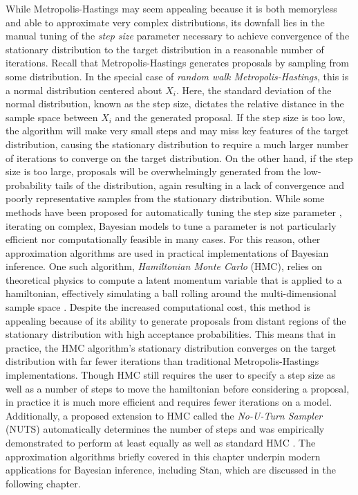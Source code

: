 \documentclass[
  12pt,
]{book}
\theoremstyle{definition}
\theoremstyle{definition}
\theoremstyle{definition}
\theoremstyle{remark}
\begin{document}
While Metropolis-Hastings may seem appealing because it is both memoryless and able to approximate very complex distributions, its downfall lies in the manual tuning of the \emph{step size} parameter necessary to achieve convergence of the stationary distribution to the target distribution in a reasonable number of iterations.
Recall that Metropolis-Hastings generates proposals by sampling from some distribution.
In the special case of \emph{random walk Metropolis-Hastings}, this is a normal distribution centered about \(X_{i}\).
Here, the standard deviation of the normal distribution, known as the step size, dictates the relative distance in the sample space between \(X_{i}\) and the generated proposal.
If the step size is too low, the algorithm will make very small steps and may miss key features of the target distribution, causing the stationary distribution to require a much larger number of iterations to converge on the target distribution.
On the other hand, if the step size is too large, proposals will be overwhelmingly generated from the low-probability tails of the distribution, again resulting in a lack of convergence and poorly representative samples from the stationary distribution.
While some methods have been proposed for automatically tuning the step size parameter \citep{Graves2011}, iterating on complex, Bayesian models to tune a parameter is not particularly efficient nor computationally feasible in many cases.
For this reason, other approximation algorithms are used in practical implementations of Bayesian inference.
One such algorithm, \emph{Hamiltonian Monte Carlo} (HMC), relies on theoretical physics to compute a latent momentum variable that is applied to a hamiltonian, effectively simulating a ball rolling around the multi-dimensional sample space \citep{Brooks2011}.
Despite the increased computational cost, this method is appealing because of its ability to generate proposals from distant regions of the stationary distribution with high acceptance probabilities.
This means that in practice, the HMC algorithm's stationary distribution converges on the target distribution with far fewer iterations than traditional Metropolis-Hastings implementations.
Though HMC still requires the user to specify a step size as well as a number of steps to move the hamiltonian before considering a proposal, in practice it is much more efficient and requires fewer iterations on a model.
Additionally, a proposed extension to HMC called the \emph{No-U-Turn Sampler} (NUTS) automatically determines the number of steps and was empirically demonstrated to perform at least equally as well as standard HMC \citep{Homan2014}.
The approximation algorithms briefly covered in this chapter underpin modern applications for Bayesian inference, including Stan, which are discussed in the following chapter.
\end{document}

